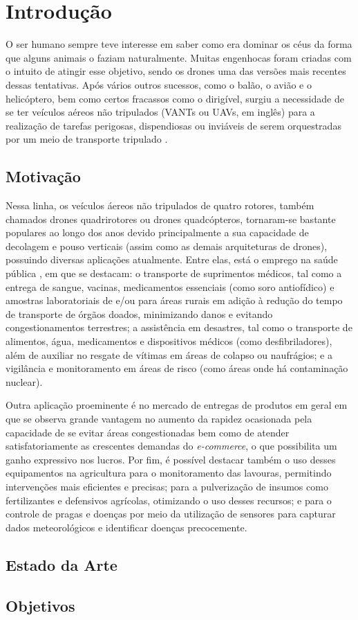 \section{Introdução}
O ser humano sempre teve interesse em saber como era dominar os céus da forma que alguns animais o faziam 
naturalmente. Muitas engenhocas foram criadas com o intuito de atingir esse objetivo, sendo os drones uma das 
versões mais recentes dessas tentativas. Após vários outros sucessos, como o balão, o avião e o helicóptero, bem 
como certos fracassos como o dirigível, surgiu a necessidade de se ter veículos aéreos não tripulados (VANTs ou 
UAVs, em inglês) para a realização de tarefas perigosas, dispendiosas ou inviáveis de serem orquestradas por um 
meio de transporte tripulado \cite{ita}.

\subsection{Motivação}
Nessa linha, os veículos áereos não tripulados de quatro rotores, também chamados drones quadrirotores ou drones 
quadcópteros, tornaram-se bastante populares ao longo dos anos devido principalmente a sua capacidade de decolagem 
e pouso verticais (assim como as demais arquiteturas de drones), possuindo diversas aplicações atualmente. Entre 
elas, está o emprego na saúde pública \cite{drone_medico}, em que se destacam: o transporte de suprimentos médicos, 
tal como a entrega de sangue, vacinas, medicamentos essenciais (como soro antiofídico) e amostras laboratoriais de 
e/ou para áreas rurais em adição à redução do tempo de transporte de órgãos doados, minimizando danos e evitando 
congestionamentos terrestres; a assistência em desastres, tal como o transporte de alimentos, água, medicamentos e 
dispositivos médicos (como desfibriladores), além de auxiliar no resgate de vítimas em áreas de colapso ou 
naufrágios; e a vigilância e monitoramento em áreas de risco (como áreas onde há contaminação nuclear).

Outra aplicação proeminente é no mercado de entregas de produtos em geral \cite{drone_entrega} em que se observa 
grande vantagem no aumento da rapidez ocasionada pela capacidade de se evitar áreas congestionadas bem como de 
atender satisfatoriamente as crescentes demandas do \textit{e-commerce}, o que possibilita um ganho expressivo nos 
lucros. Por fim, é possível destacar também o uso desses equipamentos na agricultura \cite{drone_agricultura} para o 
monitoramento das lavouras, permitindo intervenções mais eficientes e precisas; para a pulverização de insumos como 
fertilizantes e defensivos agrícolas, otimizando o uso desses recursos; e para o controle de pragas e doenças por meio 
da utilização de sensores para capturar dados meteorológicos e identificar doenças precocemente.

\subsection{Estado da Arte}
\lipsum[1]

\subsection{Objetivos}
\lipsum[1]